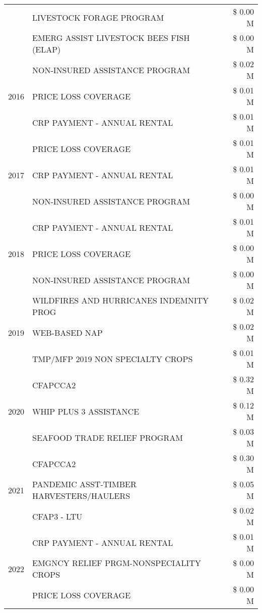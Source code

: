 \begin{tabular}{llr}
 & LIVESTOCK FORAGE PROGRAM & \$ 0.00 M \\
 & EMERG ASSIST LIVESTOCK BEES FISH (ELAP) & \$ 0.00 M \\
\cline{1-3}
\multirow[t]{3}{*}{2016} & NON-INSURED ASSISTANCE PROGRAM & \$ 0.02 M \\
 & PRICE LOSS COVERAGE & \$ 0.01 M \\
 & CRP PAYMENT - ANNUAL RENTAL & \$ 0.01 M \\
\cline{1-3}
\multirow[t]{3}{*}{2017} & PRICE LOSS COVERAGE & \$ 0.01 M \\
 & CRP PAYMENT - ANNUAL RENTAL & \$ 0.01 M \\
 & NON-INSURED ASSISTANCE PROGRAM & \$ 0.00 M \\
\cline{1-3}
\multirow[t]{3}{*}{2018} & CRP PAYMENT - ANNUAL RENTAL & \$ 0.01 M \\
 & PRICE LOSS COVERAGE & \$ 0.00 M \\
 & NON-INSURED ASSISTANCE PROGRAM & \$ 0.00 M \\
\cline{1-3}
\multirow[t]{3}{*}{2019} & WILDFIRES AND HURRICANES INDEMNITY PROG & \$ 0.02 M \\
 & WEB-BASED NAP & \$ 0.02 M \\
 & TMP/MFP 2019 NON SPECIALTY CROPS & \$ 0.01 M \\
\cline{1-3}
\multirow[t]{3}{*}{2020} & CFAPCCA2 & \$ 0.32 M \\
 & WHIP PLUS 3 ASSISTANCE & \$ 0.12 M \\
 & SEAFOOD TRADE RELIEF PROGRAM & \$ 0.03 M \\
\cline{1-3}
\multirow[t]{3}{*}{2021} & CFAPCCA2 & \$ 0.30 M \\
 & PANDEMIC ASST-TIMBER HARVESTERS/HAULERS & \$ 0.05 M \\
 & CFAP3 - LTU & \$ 0.02 M \\
\cline{1-3}
\multirow[t]{3}{*}{2022} & CRP PAYMENT - ANNUAL RENTAL & \$ 0.01 M \\
 & EMGNCY RELIEF PRGM-NONSPECIALITY CROPS & \$ 0.00 M \\
 & PRICE LOSS COVERAGE & \$ 0.00 M \\
\cline{1-3}
\bottomrule
\end{tabular}
